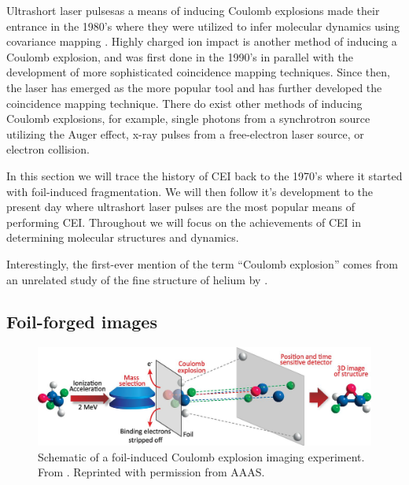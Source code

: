 Ultrashort laser pulses\footnotemark as a means of inducing Coulomb explosions made their entrance in the 1980's where they were utilized to infer molecular dynamics using covariance mapping \citep{Frasinski89}. Highly charged ion impact is another method of inducing a Coulomb explosion, and was first done in the 1990's in parallel with the development of more sophisticated coincidence mapping techniques. Since then, the laser has emerged as the more popular tool and has further developed the coincidence mapping technique. There do exist other methods of inducing Coulomb explosions, for example, single photons from a synchrotron source utilizing the Auger effect, x-ray pulses from a free-electron laser source, or electron collision.

In this section we will trace the history of CEI back to the 1970's where it started with foil-induced fragmentation. We will then follow it's development to the present day where ultrashort laser pulses are the most popular means of performing CEI. Throughout we will focus on the achievements of CEI in determining molecular structures and dynamics.


Interestingly, the first-ever mention of the term ``Coulomb explosion'' comes from an unrelated study of the fine structure of helium by \citet{Novick55}.

\subsection{Foil-forged images}


\begin{figure}
  \centering
  \includegraphics[width=\textwidth]{gfx/FoilExperiment}
  \caption[Schematic of a foil-induced Coulomb explosion imaging experiment.]
  {Schematic of a foil-induced Coulomb explosion imaging experiment. From \citet{Herwig13}. Reprinted with permission from AAAS.}
\end{figure}

